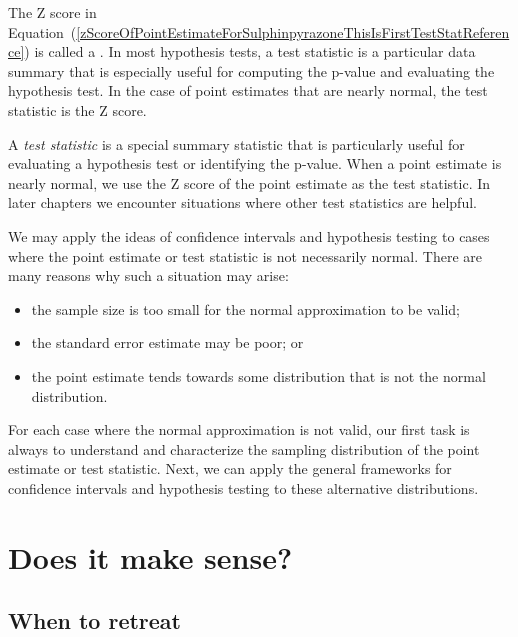 {The Z score in Equation~(\ref{zScoreOfPointEstimateForSulphinpyrazoneThisIsFirstTestStatReference}) is called a . In most hypothesis tests, a test statistic is a particular data summary that is especially useful for computing the p-value and evaluating the hypothesis test. In the case of point estimates that are nearly normal, the test statistic is the Z score.

\begin{termBox}{
A \emph{test statistic} is a special summary statistic that is particularly useful for evaluating a hypothesis test or identifying the p-value. When a point estimate is nearly normal, we use the Z score of the point estimate as the test statistic. In later chapters we encounter situations where other test statistics are helpful.}
\end{termBox}



We may apply the ideas of confidence intervals and hypothesis testing to cases where the point estimate or test statistic is not necessarily normal. There are many reasons why such a situation may arise:
\begin{itemize}
\setlength{\itemsep}{0mm}
\item the sample size is too small for the normal approximation to be valid;
\item the standard error estimate may be poor; or
\item the point estimate tends towards some distribution that is not the normal distribution.
\end{itemize}
For each case where the normal approximation is not valid, our first task is always to understand and characterize the sampling distribution of the point estimate or test statistic. Next, we can apply the general frameworks for confidence intervals and hypothesis testing to these alternative distributions.
}

\section{Does it make sense?}
\subsection{When to retreat}
\label{whenToRetreat}

